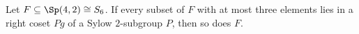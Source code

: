 Let $F\subseteq\Sp(4,2)\cong S_6$. If every subset of $F$ with at most three elements lies in a right coset $Pg$ of a Sylow $2$-subgroup $P$, then so does $F$.
